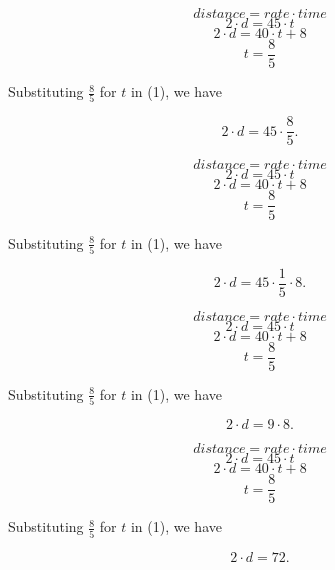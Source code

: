 \documentclass{beamer} %
\begin{document}
\setcounter{equation}{0}

\begin{frame}
\[
distance = rate \cdot time
\]
\begin{equation}
2\cdot d = 45\cdot t
\end{equation}
\begin{equation}
2\cdot d = 40\cdot t + 8
\end{equation}
\begin{equation}
t = \frac{8}{5}
\end{equation}

\pause Substituting $\frac{8}{5}$ for $t$ in (1), we have \pause

\[
2\cdot d = 45\cdot \frac{8}{5}.
\]
\end{frame}

\setcounter{equation}{0}

\begin{frame}
\[
distance = rate \cdot time
\]
\begin{equation}
2\cdot d = 45\cdot t
\end{equation}
\begin{equation}
2\cdot d = 40\cdot t + 8
\end{equation}
\begin{equation}
t = \frac{8}{5}
\end{equation}

Substituting $\frac{8}{5}$ for $t$ in (1), we have

\[
2\cdot d = 45\cdot \frac{1}{5}\cdot 8.
\]
\end{frame}

\setcounter{equation}{0}

\begin{frame}
\[
distance = rate \cdot time
\]
\begin{equation}
2\cdot d = 45\cdot t
\end{equation}
\begin{equation}
2\cdot d = 40\cdot t + 8
\end{equation}
\begin{equation}
t = \frac{8}{5}
\end{equation}

Substituting $\frac{8}{5}$ for $t$ in (1), we have

\[
2\cdot d = 9\cdot 8.
\]
\end{frame}

\setcounter{equation}{0}

\begin{frame}
\[
distance = rate \cdot time
\]
\begin{equation}
2\cdot d = 45\cdot t
\end{equation}
\begin{equation}
2\cdot d = 40\cdot t + 8
\end{equation}
\begin{equation}
t = \frac{8}{5}
\end{equation}

Substituting $\frac{8}{5}$ for $t$ in (1), we have

\[
2\cdot d = 72.
\]
\end{frame}
\end{document}
